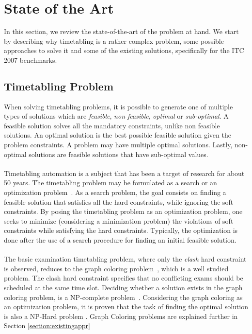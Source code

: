 \chapter{State of the Art}
\label{stateofart}
\thispagestyle{plain}

In this section, we review the state-of-the-art of the problem at hand. We start by describing why timetabling is a rather complex problem, some possible approaches to solve it and some of the existing solutions, specifically for the ITC 2007 benchmarks.\\

\section{Timetabling Problem}

When solving timetabling problems, it is possible to generate one of multiple types of solutions which are \textit{feasible}, \textit{non feasible}, \textit{optimal} or \textit{sub-optimal}. A feasible solution solves all the mandatory constraints, unlike non feasible solutions. An optimal solution is the best possible feasible solution given the problem constraints. A problem may have multiple optimal solutions. Lastly, non-optimal solutions are feasible solutions that have sub-optimal values.\\
\\
Timetabling automation is a subject that has been a target of research for about 50 years. The timetabling problem may be formulated as a search or an optimization problem~\cite{Schaerf1999}. As a search problem, the goal consists on finding a feasible solution that satisfies all the hard constraints, while ignoring the soft constraints. By posing the timetabling problem as an optimization problem, one seeks to minimize (considering a minimization problem) the violations of soft constraints while satisfying the hard constraints. Typically, the optimization is done after the use of a search procedure for finding an initial feasible solution.\\
\\
The basic examination timetabling problem, where only the \textit{clash} hard constraint is observed, reduces to the graph coloring problem~\cite{Jensen2001}, which is a well studied problem. The clash hard constraint specifies that no conflicting exams should be scheduled at the same time slot. Deciding whether a solution exists in the graph coloring problem, is a NP-complete problem~\cite{Arora2009}. Considering the graph coloring as an optimization problem, it is proven that the task of finding the optimal solution is also a NP-Hard problem \cite{Arora2009}. Graph Coloring problems are explained further in Section \ref{section:existingappr}
\\

